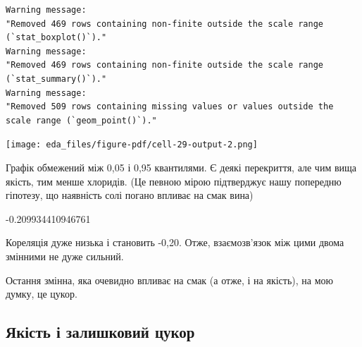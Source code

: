 \documentclass[
  letterpaper,
  DIV=11,
  numbers=noendperiod]{scrreprt}
\newenvironment{Shaded}{\begin{snugshade}}{\end{snugshade}}
\newcommand{\FunctionTok}[1]{\textcolor[rgb]{0.28,0.35,0.67}{#1}}
\newcommand{\NormalTok}[1]{\textcolor[rgb]{0.00,0.23,0.31}{#1}}
\newcommand{\SpecialCharTok}[1]{\textcolor[rgb]{0.37,0.37,0.37}{#1}}
\begin{document}
\begin{verbatim}
Warning message:
"Removed 469 rows containing non-finite outside the scale range (`stat_boxplot()`)."
Warning message:
"Removed 469 rows containing non-finite outside the scale range (`stat_summary()`)."
Warning message:
"Removed 509 rows containing missing values or values outside the scale range (`geom_point()`)."
\end{verbatim}

\texttt{[image: eda\_files/figure-pdf/cell-29-output-2.png]}

Графік обмежений між 0,05 і 0,95 квантилями. Є деякі перекриття, але чим
вища якість, тим менше хлоридів. (Це певною мірою підтверджує нашу
попередню гіпотезу, що наявність солі погано впливає на смак вина)

\begin{Shaded}
\end{Shaded}

-0.209934410946761

Кореляція дуже низька і становить -0,20. Отже, взаємозв'язок між цими
двома змінними не дуже сильний.

Остання змінна, яка очевидно впливає на смак (а отже, і на якість), на
мою думку, це цукор.

\subsection{Якість і залишковий
цукор}\label{ux44fux43aux456ux441ux442ux44c-ux456-ux437ux430ux43bux438ux448ux43aux43eux432ux438ux439-ux446ux443ux43aux43eux440}
\end{document}
